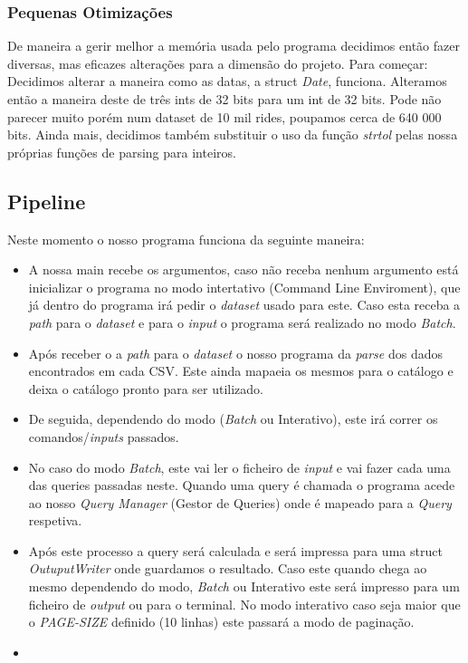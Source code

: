 \documentclass{article}
\begin{document}
        \subsubsection{Pequenas Otimizações}
            De maneira a gerir melhor a memória usada pelo programa decidimos então
            fazer diversas, mas eficazes alterações para a dimensão do projeto.
            Para começar:
            Decidimos alterar a maneira como as datas, a struct \emph{Date},
            funciona. Alteramos então a maneira deste de três ints de 32 bits para um int de 32 bits.
            Pode não parecer muito porém num dataset de 10 mil rides, poupamos cerca de 
            640 000 bits.
            Ainda mais, decidimos também substituir o uso da função \emph{strtol}
            pelas nossa próprias funções de parsing para inteiros.

    \subsection{Pipeline}
        Neste momento o nosso programa funciona da seguinte maneira:
        \begin{itemize}
            \item A nossa main recebe os argumentos, caso não receba nenhum argumento 
            está inicializar o programa no modo intertativo (Command Line Enviroment), 
            que já dentro do programa irá pedir o \emph{dataset} usado para este. Caso 
            esta receba a \emph{path} para o \emph{dataset} e para o \emph{input} o programa 
            será realizado no modo \emph{Batch}.
            \item Após receber o a \emph{path} para o \emph{dataset} o nosso programa da
            \emph{parse} dos dados encontrados em cada CSV. Este ainda mapaeia os mesmos 
            para o catálogo e deixa o catálogo pronto para ser utilizado.
            \item De seguida, dependendo do modo (\emph{Batch} ou Interativo), este irá 
            correr os comandos/\emph{inputs} passados.
            \item No caso do modo \emph{Batch}, este vai ler o ficheiro de \emph{input} 
            e vai fazer cada uma das queries passadas neste. Quando uma query é chamada 
            o programa acede ao nosso \emph{Query Manager} (Gestor de Queries) onde é 
            mapeado para a \emph{Query} respetiva. 
            \item Após este processo a query será calculada e será impressa para uma struct
            \emph{OutuputWriter} onde guardamos o resultado. Caso este quando chega ao mesmo 
            dependendo do modo, \emph{Batch} ou Interativo este será impresso para um ficheiro
            de \emph{output} ou para o terminal. No modo interativo caso seja maior que o 
            \emph{PAGE-SIZE} definido (10 linhas) este passará a modo de paginação.
            \item 
            
        \end{itemize}
\end{document}
